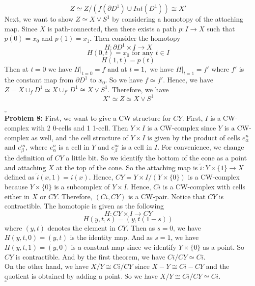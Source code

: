 \documentclass[12pt]{amsart}
\begin{document}
$$Z\simeq Z/(f(\partial D^1)\cup Int(D^1))\cong X'$$
Next, we want to show $Z\simeq X\vee S^1$ by considering a homotopy of the attaching map. Since $X$ is path-connected, then there exists a path $p:I\to X$ such that $p(0)=x_0$ and $p(1)=x_1$. Then consider the homotopy 
\[H:\partial D^1\times I\to X\]
\[H(0,t)=x_0\text{ for any }t\in I\]
\[H(1,t)=p(t)\]
Then at $t=0$ we have $H|_{t=0}=f$ and at $t=1,$ we have $H|_{t=1}=f'$ where $f'$ is the constant map from $\partial D^1$ to $x_0$. So we have $f\simeq f'$. Hence, we have $Z=X\cup_f D^1\simeq X\cup_{f'} D^1\cong X\vee S^1$.
Therefore, we have 
\[X'\simeq Z\simeq X\vee S^1\]
\\\phantom{qed}\hfill$\square$\\
\textbf{Problem 8:} First, we want to give a CW structure for $CY$. First, $I$ is a CW-complex with 2 0-cells and 1 1-cell. Then $Y\times I$ is a CW-complex since $Y$ is a CW-complex as well, and the cell structure of $Y\times I$ is given by the product of cells $e^n_\alpha$ and $e^m_\beta$, where $e^n_\alpha$ is a cell in $Y$ and $e^m_\beta$ is a cell in $I$. For convenience, we change the definition of $CY$ a little bit. So we identify the bottom of the cone as a point and attaching $X$ at the top of the cone. So the attaching map is $\tilde{i}:Y\times \{1\}\to X$ defined as $\tilde{i}(x,1)=i(x)$. Hence, $CY=Y\times I/(Y\times \{0\})$ is a CW-complex because $Y\times \{0\}$ is a subcomplex of $Y\times I$. Hence, $Ci$ is a CW-complex with cells either in $X$ or $CY$. Therefore, $(Ci,CY)$ is a CW-pair. Notice that $CY$ is contractible. The homotopic is given as the following 
\[H:CY \times I\to CY\]
\[H(y,t,s)=(y,t(1-s))\]
where $(y,t)$ denotes the element in $CY$.
Then as $s=0$, we have $H(y,t,0)=(y,t)$ is the identity map. And as $s=1$, we have $H(y,t,1)=(y,0)$ is a constant map since we identify $Y\times \{0\}$ as a point.
So $CY$ is contractible. And by the first theorem, we have $Ci/CY\simeq Ci$.\\
On the other hand, we have $X/Y\cong Ci/CY$ since $X-Y\cong Ci-CY$ and the quotient is obtained by adding a point. So we have $X/Y\cong Ci/CY\simeq Ci$.
\\\phantom{qed}\hfill$\square$\\
\end{document}
